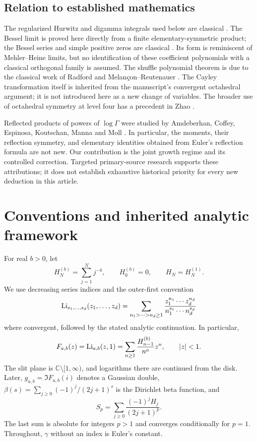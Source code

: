 \subsection{Relation to established mathematics}
The regularized Hurwitz and digamma integrals used below are classical
\cite{DLMFhurwitz,DLMFdigamma}. The Bessel limit is proved here directly
from a finite elementary-symmetric product; the Bessel series and simple
positive zeros are classical \cite{DLMFbessel}. Its form is reminiscent
of Mehler--Heine limits, but no identification of these coefficient
polynomials with a classical orthogonal family is assumed.
The shuffle polynomial theorem is due to the classical work of Radford
and Melan\c{c}on--Reutenauer
\cite{cayley:radford,cayley:melancon-reutenauer}.
The Cayley transformation itself is inherited from the manuscript's
convergent octahedral argument; it is not introduced here as a new
change of variables. The broader use of octahedral symmetry at level
four has a precedent in Zhao \cite{ZhaoOctahedral}.

Reflected products of powers of $\log\Gamma$ were studied by
Amdeberhan, Coffey, Espinosa, Koutschan, Manna and Moll
\cite{ACEKMM}. In particular, the moments, their reflection symmetry,
and elementary identities obtained from Euler's reflection formula are
not new. Our contribution is the joint growth regime and its controlled
correction. Targeted primary-source research supports these attributions;
it does not establish exhaustive historical priority for every new
deduction in this article.

\section{Conventions and inherited analytic framework}
\label{sec:conventions}

For real $b>0$, let
\[
 H_N^{(b)}=\sum_{j=1}^N j^{-b},\qquad H_0^{(b)}=0,
 \qquad H_N=H_N^{(1)}.
\]
We use decreasing series indices and the outer-first convention
\[
 \operatorname{Li}_{s_1,\ldots,s_d}(z_1,\ldots,z_d)
 =\sum_{n_1>\cdots>n_d\ge1}
 \frac{z_1^{n_1}\cdots z_d^{n_d}}
 {n_1^{s_1}\cdots n_d^{s_d}}
\]
where convergent, followed by the stated analytic continuation.
In particular,
\[
 F_{a,b}(z)=\operatorname{Li}_{a,b}(z,1)
 =\sum_{n\ge1}\frac{H_{n-1}^{(b)}}{n^a}z^n,
 \qquad |z|<1.
\]
The slit plane is $\mathbb C\setminus[1,\infty)$, and logarithms
there are continued from the disk. Later, $g_{a,b}=\Im F_{a,b}(i)$
denotes a Gaussian double, $\beta(s)=\sum_{j\ge0}(-1)^j/(2j+1)^s$
is the Dirichlet beta function, and
\[
 S_p=\sum_{j\ge0}\frac{(-1)^jH_j}{(2j+1)^p}.
\]
The last sum is absolute for integers $p>1$ and converges conditionally
for $p=1$. Throughout, $\gamma$ without an index is Euler's constant.

